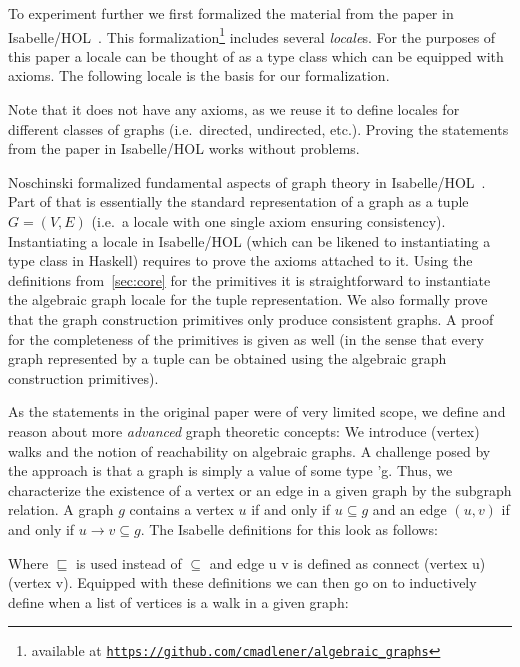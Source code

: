 \documentclass{article}
\newcommand*{\term}[1]{{\isaspacing\isastyle }}
\newcommand*{\Term}[1]{{\isaspacing\isastyle #1}}
\newcommand{\connect}{\rightarrow}
\begin{document}
To experiment further we first formalized the material from the paper in
Isabelle/HOL~\cite{isabelle}.
This formalization\footnote{available at
  \texttt{\href{https://github.com/cmadlener/algebraic_graphs}{https://github.com/cmadlener/algebraic\_graphs}}}
includes several \textit{locale}s. For the purposes of this paper a
locale can be thought of as a type class which can be equipped with axioms. The
following locale is the basis for our formalization.

\vspace{3mm}
\term{terms/locale_primitives}
\vspace{3mm}\newline
Note that it does not have any
axioms, as we reuse it to define locales for different classes of graphs (i.e.\
directed, undirected, etc.). Proving the statements from the paper in Isabelle/HOL works
without problems.

Noschinski formalized fundamental aspects of graph theory in
Isabelle/HOL~\cite{GraphTheory-AFP}. Part of that is essentially the standard
representation of a graph as a tuple $G=(V,E)$ (i.e.\ a locale with one single
axiom ensuring consistency). Instantiating a locale in Isabelle/HOL (which can be likened to
instantiating a type class in Haskell) requires to prove the axioms attached to
it. Using the definitions from~\autoref{sec:core} for the primitives it is
straightforward to instantiate the algebraic graph locale for the tuple
representation. We also formally prove that the graph construction primitives only
produce consistent graphs. A proof for the completeness of the primitives is
given as well (in the sense that every graph represented by a tuple can be
obtained using the algebraic graph construction primitives).

As the statements in the original paper were of very limited scope, we 
define and reason about more \textit{advanced} graph theoretic concepts: We
introduce (vertex) walks and the notion of reachability on algebraic graphs. A
challenge posed by the approach is that a graph is simply a value of some
type \Term{'g}. Thus, we characterize the existence of a vertex or an
edge in a given graph by the subgraph relation.
A graph $g$ contains a vertex $u$ if and only if $u \subseteq g$ and an edge
$(u,v)$ if and only if $u \connect v \subseteq g$. The Isabelle definitions for
this look as follows:

\vspace{3mm}
\term{terms/has_elem}
\vspace{3mm}\newline
Where $\sqsubseteq$ is used instead of $\subseteq$ and \Term{edge u v} is
defined as \Term{connect (vertex u) (vertex v)}.
Equipped with these definitions we can then go on to inductively define when a
list of vertices is a walk in a given graph:
\end{document}
